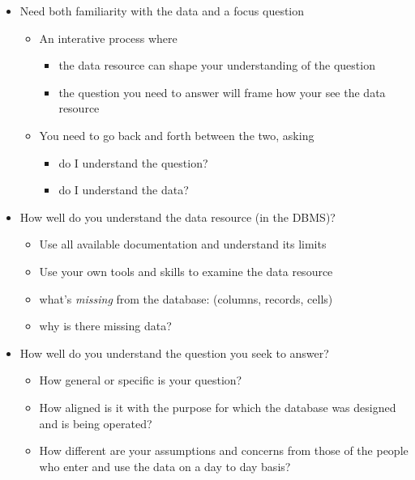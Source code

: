 \documentclass[]{book}
\providecommand{\tightlist}{%
  \setlength{\itemsep}{0pt}\setlength{\parskip}{0pt}}
\theoremstyle{definition}
\theoremstyle{definition}
\theoremstyle{definition}
\theoremstyle{remark}
\begin{document}
\begin{itemize}
\tightlist
\item
  Need both familiarity with the data and a focus question

  \begin{itemize}
  \tightlist
  \item
    An interative process where

    \begin{itemize}
    \tightlist
    \item
      the data resource can shape your understanding of the question
    \item
      the question you need to answer will frame how your see the data
      resource
    \end{itemize}
  \item
    You need to go back and forth between the two, asking

    \begin{itemize}
    \tightlist
    \item
      do I understand the question?
    \item
      do I understand the data?
    \end{itemize}
  \end{itemize}
\item
  How well do you understand the data resource (in the DBMS)?

  \begin{itemize}
  \tightlist
  \item
    Use all available documentation and understand its limits
  \item
    Use your own tools and skills to examine the data resource
  \item
    what's \emph{missing} from the database: (columns, records, cells)
  \item
    why is there missing data?
  \end{itemize}
\item
  How well do you understand the question you seek to answer?

  \begin{itemize}
  \tightlist
  \item
    How general or specific is your question?
  \item
    How aligned is it with the purpose for which the database was
    designed and is being operated?
  \item
    How different are your assumptions and concerns from those of the
    people who enter and use the data on a day to day basis?
  \end{itemize}
\end{itemize}
\end{document}
